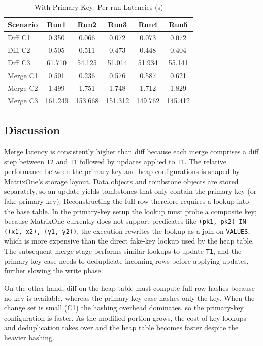 \documentclass[sigconf,nonacm]{acmart} %
\begin{document}
\begin{table}[h]
  \centering
  \caption{With Primary Key: Per-run Latencies (s)}
  \label{tab:pk-runs}
  \begin{tabular}{lccccc}
    \toprule
    Scenario & Run1 & Run2 & Run3 & Run4 & Run5 \\
    \midrule
    Diff C1  & 0.350 & 0.066 & 0.072 & 0.073 & 0.072 \\
    Diff C2  & 0.505 & 0.511 & 0.473 & 0.448 & 0.404 \\
    Diff C3  & 61.710 & 54.125 & 51.014 & 51.934 & 55.141 \\
    Merge C1 & 0.501 & 0.236 & 0.576 & 0.587 & 0.621 \\
    Merge C2 & 1.499 & 1.751 & 1.748 & 1.712 & 1.829 \\
    Merge C3 & 161.249 & 153.668 & 151.312 & 149.762 & 145.412 \\
    \bottomrule
  \end{tabular}
\end{table}

\subsection{Discussion}
Merge latency is consistently higher than diff because each merge
comprises a diff step between \texttt{T2} and \texttt{T1} followed by
updates applied to \texttt{T1}.  The relative performance between the
primary-key and heap configurations is shaped by MatrixOne's storage
layout.  Data objects and tombstone objects are stored separately, so an
update yields tombstones that only contain the primary key (or fake
primary key).  Reconstructing the full row therefore requires a lookup
into the base table.  In the primary-key setup the lookup must probe a
composite key; because MatrixOne currently does not support predicates
like \texttt{(pk1, pk2) IN ((x1, x2), (y1, y2))}, the execution rewrites
the lookup as a join on \texttt{VALUES}, which is more expensive than
the direct fake-key lookup used by the heap table.  The subsequent merge
stage performs similar lookups to update \texttt{T1}, and the primary-key
case needs to deduplicate incoming rows before applying updates, further
slowing the write phase.

On the other hand, diff on the heap table must compute full-row hashes
because no key is available, whereas the primary-key case hashes only
the key.  When the change set is small (C1) the hashing overhead
dominates, so the primary-key configuration is faster.  As the modified
portion grows, the cost of key lookups and deduplication takes over and
the heap table becomes faster despite the heavier hashing.
\end{document}
